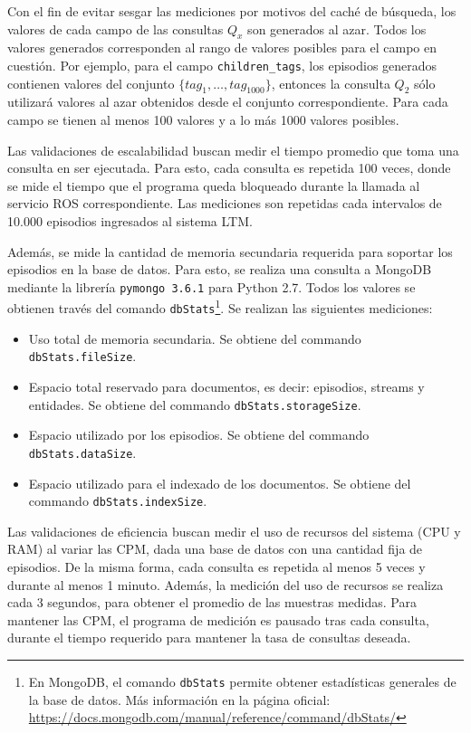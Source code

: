 Con el fin de evitar sesgar las mediciones por motivos del caché de búsqueda, los valores de cada campo de las consultas $Q_x$ son generados al azar.  Todos los valores generados corresponden al rango de valores posibles para el campo en cuestión. Por ejemplo, para el campo \texttt{children\_tags}, los episodios generados contienen valores del conjunto $\{ tag_1,\ldots, tag_{1000} \}$, entonces la consulta $Q_2$ sólo utilizará valores al azar obtenidos desde el conjunto correspondiente. Para cada campo se tienen al menos 100 valores y a lo más 1000 valores posibles.

Las validaciones de escalabilidad buscan medir el tiempo promedio que toma una consulta en ser ejecutada. Para esto, cada consulta es repetida 100 veces, donde se mide el tiempo que el programa queda bloqueado durante la llamada al servicio ROS correspondiente. Las mediciones son repetidas cada intervalos de 10.000 episodios ingresados al sistema LTM.

Además, se mide la cantidad de memoria secundaria requerida para soportar los episodios en la base de datos. Para esto, se realiza una consulta a MongoDB mediante la librería \texttt{pymongo 3.6.1} para Python 2.7. Todos los valores se obtienen través del comando \texttt{dbStats}\footnote{En MongoDB, el comando \texttt{dbStats} permite obtener estadísticas generales de la base de datos. Más información en la página oficial: \url{https://docs.mongodb.com/manual/reference/command/dbStats/}}. Se realizan las siguientes mediciones:
\begin{itemize}
\item Uso total de memoria secundaria. Se obtiene del commando \texttt{dbStats.fileSize}.
\item Espacio total reservado para documentos, es decir: episodios, streams y entidades. Se obtiene del commando \texttt{dbStats.storageSize}.
\item Espacio utilizado por los episodios. Se obtiene del commando \texttt{dbStats.dataSize}.
\item Espacio utilizado para el indexado de los documentos. Se obtiene del commando \texttt{dbStats.indexSize}.
\end{itemize}

Las validaciones de eficiencia buscan medir el uso de recursos del sistema (CPU y RAM) al variar las CPM, dada una base de datos con una cantidad fija de episodios. De la misma forma, cada consulta es repetida al menos 5 veces y durante al menos 1 minuto. Además, la medición del uso de recursos se realiza cada 3 segundos, para obtener el promedio de las muestras medidas. Para mantener las CPM, el programa de medición es pausado tras cada consulta, durante el tiempo requerido para mantener la tasa de consultas deseada.

